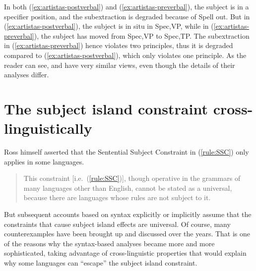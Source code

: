 \eal 
{}
		\label{ex:artistas-postverbal}
		\label{ex:artistas-preverbal}
\zl 

In both (\ref{ex:artistas-postverbal}) and (\ref{ex:artistas-preverbal}), the subject is in a specifier position, and the subextraction is degraded because of Spell out. But in (\ref{ex:artistas-postverbal}), the subject is in situ in Spec,VP, while in (\ref{ex:artistas-preverbal}), the subject has moved from Spec,VP to Spec,TP. The subextraction in (\ref{ex:artistas-preverbal}) hence violates two principles, thus it is degraded compared to (\ref{ex:artistas-postverbal}), which only violates one principle. As the reader can see, \citet{Uriagereka.2012} and \citet{Mueller.G.1998} have very similar views, even though the details of their analyses differ. 



\section{The subject island constraint cross-linguistically}

Ross himself asserted that the Sentential Subject Constraint in (\ref{rule:SSC}) only applies in some languages.

\begin{quote}
    This constraint [i.e.\ (\ref{rule:SSC})], though operative in the grammars of many languages other than English, cannot be stated as a universal, because there are languages whose rules are not subject to it. \citep[243]{Ross.1967}
\end{quote}

But subsequent accounts based on syntax explicitly or implicitly assume that the constraints that cause subject island effects are universal. Of course, many counterexamples have been brought up and discussed over the years. That is one of the reasons why the syntax-based analyses became more and more sophisticated, taking advantage of cross-linguistic properties that would explain why some languages can ``escape'' the subject island constraint.

